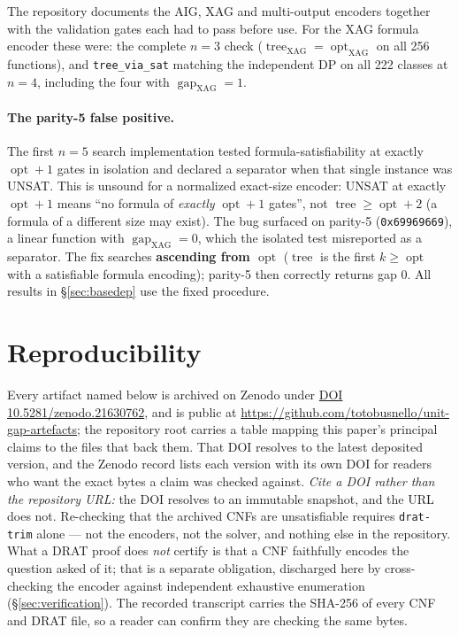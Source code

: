 \documentclass[11pt]{article}
\DeclareMathOperator{\opt}{opt}
\DeclareMathOperator{\tree}{tree}
\DeclareMathOperator{\gapop}{gap}
\newcommand{\optx}{\opt_{\mathrm{XAG}}}
\newcommand{\treex}{\tree_{\mathrm{XAG}}}
\newcommand{\gapx}{\gapop_{\mathrm{XAG}}}
\theoremstyle{plain}
\begin{document}
The repository documents the AIG, XAG and multi-output encoders together with the validation
gates each had to pass before use. For the XAG formula encoder these were: the complete $n = 3$
check ($\treex = \optx$ on all 256 functions), and \texttt{tree\_via\_sat} matching the independent
DP on all 222 classes at $n = 4$, including the four with $\gapx = 1$.

\paragraph{The parity-5 false positive.} The first $n = 5$ search implementation tested
formula-satisfiability at exactly $\opt + 1$ gates in isolation and declared a separator when that
single instance was UNSAT. This is unsound for a normalized exact-size encoder: UNSAT at exactly
$\opt + 1$ means ``no formula of \emph{exactly} $\opt + 1$ gates'', not $\tree \ge \opt + 2$ (a
formula of a different size may exist). The bug surfaced on parity-5 (\texttt{0x69969669}), a linear
function with $\gapx = 0$, which the isolated test misreported as a separator. The fix searches
\textbf{ascending from $\opt$} ($\tree$ is the first $k \ge \opt$ with a satisfiable formula
encoding); parity-5 then correctly returns gap 0. All results in \S\ref{sec:basedep} use the fixed procedure.

\section{Reproducibility}
\label{app:repro}

\begin{sloppypar}
Every artifact named below is archived on Zenodo under
\href{https://doi.org/10.5281/zenodo.21630762}{DOI 10.5281/zenodo.21630762}, and is public at
\url{https://github.com/totobusnello/unit-gap-artefacts}; the repository root carries a
table mapping this paper's principal claims to the files that back them. That DOI resolves to
the latest deposited version, and the Zenodo record lists each version with its own DOI for
readers who want the exact bytes a claim was checked against. \emph{Cite a DOI rather than the
repository URL:} the DOI resolves to an immutable snapshot, and the URL does not. Re-checking that the archived
CNFs are unsatisfiable requires \texttt{drat-trim} alone --- not the encoders, not the solver,
and nothing else in the repository. What a DRAT proof does \emph{not} certify is that a CNF
faithfully encodes the question asked of it; that is a separate obligation, discharged here by
cross-checking the encoder against independent exhaustive enumeration
(\S\ref{sec:verification}). The recorded transcript carries the SHA-256 of every CNF and DRAT
file, so a reader can confirm they are checking the same bytes.
\end{sloppypar}
\end{document}
